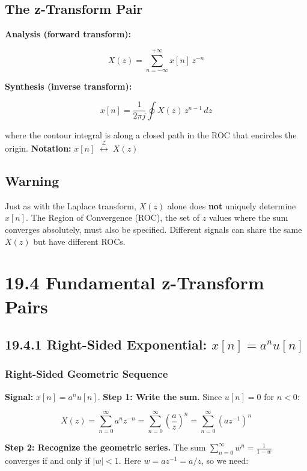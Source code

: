 \documentclass[11pt]{article}
\begin{document}
\subsection*{The z-Transform Pair}

\textbf{Analysis (forward transform):}

\[X(z) = \sum_{n=-\infty}^{+\infty} x[n]\, z^{-n}\]

\textbf{Synthesis (inverse transform):}

\[x[n] = \frac{1}{2\pi j} \oint X(z)\, z^{n-1}\, dz\]

where the contour integral is along a closed path in the ROC that encircles the origin.
\textbf{Notation:} $x[n] \;\overset{\mathcal{Z}}{\longleftrightarrow}\; X(z)$

\subsection*{Warning}

Just as with the Laplace transform, $X(z)$ alone does \textbf{not} uniquely determine $x[n]$. The Region of Convergence (ROC), the set of $z$ values where the sum converges absolutely, must also be specified. Different signals can share the same $X(z)$ but have different ROCs.

\section*{19.4 Fundamental z-Transform Pairs}

\subsection*{19.4.1 Right-Sided Exponential: $x[n] = a^n u[n]$}

\subsubsection*{Right-Sided Geometric Sequence}

\textbf{Signal:} $x[n] = a^n u[n]$.
\textbf{Step 1: Write the sum.} Since $u[n] = 0$ for $n < 0$:

\[X(z) = \sum_{n=0}^{\infty} a^n z^{-n} = \sum_{n=0}^{\infty} \left(\frac{a}{z}\right)^n = \sum_{n=0}^{\infty} (az^{-1})^n\]

\textbf{Step 2: Recognize the geometric series.} The sum $\sum_{n=0}^{\infty} w^n = \frac{1}{1-w}$ converges if and only if $|w| < 1$. Here $w = az^{-1} = a/z$, so we need:
\end{document}
